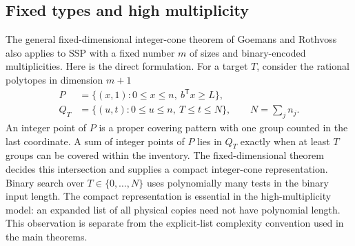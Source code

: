 \documentclass[11pt,a4paper]{article}
\theoremstyle{definition}
\theoremstyle{remark}
\begin{document}
\subsection{Fixed types and high multiplicity}
The general fixed-dimensional integer-cone theorem of Goemans and Rothvoss~\cite{GR20} also applies to SSP with a fixed number $m$ of sizes and binary-encoded multiplicities. Here is the direct formulation. For a target $T$, consider the rational polytopes in dimension $m+1$
\[
 \begin{aligned}
 P&=\{(x,1):0\le x\le n,\ b^{\mathsf T}x\ge L\},\\
 Q_T&=\{(u,t):0\le u\le n,\ T\le t\le N\},
 \qquad N=\sum_jn_j.
 \end{aligned}
\]
An integer point of $P$ is a proper covering pattern with one group counted in the last coordinate. A sum of integer points of $P$ lies in $Q_T$ exactly when at least $T$ groups can be covered within the inventory. The fixed-dimensional theorem decides this intersection and supplies a compact integer-cone representation. Binary search over $T\in\{0,\ldots,N\}$ uses polynomially many tests in the binary input length. The compact representation is essential in the high-multiplicity model: an expanded list of all physical copies need not have polynomial length. This observation is separate from the explicit-list complexity convention used in the main theorems.
\end{document}
